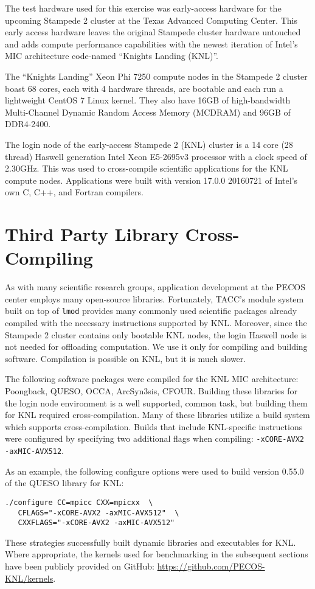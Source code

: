 The test hardware used for this exercise was early-access hardware for the
upcoming Stampede 2 cluster at the Texas Advanced Computing Center.  This early
access hardware leaves
the original Stampede cluster hardware untouched and adds compute performance
capabilities with the newest iteration of Intel's MIC architecture code-named
``Knights Landing (KNL)''.

The ``Knights Landing'' Xeon Phi 7250 compute nodes in the Stampede 2
cluster boast 68 cores, each with 4 hardware threads, are bootable and each run
a lightweight CentOS 7 Linux kernel.  They also have 16GB of high-bandwidth
Multi-Channel Dynamic Random Access Memory (MCDRAM) and 96GB of DDR4-2400.

The login node of the early-access Stampede 2 (KNL) cluster is a 14 core (28 thread)
Haswell generation Intel Xeon E5-2695v3 processor with a clock speed of
2.30GHz.  This was used to cross-compile scientific applications for the KNL
compute nodes.  Applications were built with version 17.0.0 20160721 of Intel's
own C, C++, and Fortran compilers.

\section{Third Party Library Cross-Compiling}
\label{sec:cross_compile}

As with many scientific research groups, application development at the PECOS
center employs many open-source libraries.  Fortunately, TACC's module system
built on top of \texttt{lmod} provides many commonly used scientific packages
already compiled with the necessary instructions supported by KNL.  Moreover,
since the Stampede 2 cluster contains only bootable KNL nodes, the login
Haswell node is not needed for offloading computation.  We use it only for
compiling and building software.  Compilation is possible on KNL, but it is
much slower.

The following software packages were compiled for the KNL MIC architecture:
Poongback, QUESO, OCCA, ArcSyn3sis, CFOUR.  Building these libraries
for the login node environment is a well supported, common task, but building
them for KNL required cross-compilation.  Many of these libraries utilize a
build system which supports cross-compilation.  Builds that include
KNL-specific instructions were configured by specifying two additional flags
when compiling: \texttt{-xCORE-AVX2 -axMIC-AVX512}.

As an example, the following configure options were used to build version
0.55.0 of the QUESO library for KNL:

{\small
\begin{verbatim}
./configure CC=mpicc CXX=mpicxx  \
   CFLAGS="-xCORE-AVX2 -axMIC-AVX512"  \
   CXXFLAGS="-xCORE-AVX2 -axMIC-AVX512"
\end{verbatim}
}

These strategies successfully built dynamic libraries and executables for KNL.
Where appropriate, the kernels used for benchmarking in the subsequent sections have been 
publicly provided on GitHub: \url{https://github.com/PECOS-KNL/kernels}. 
